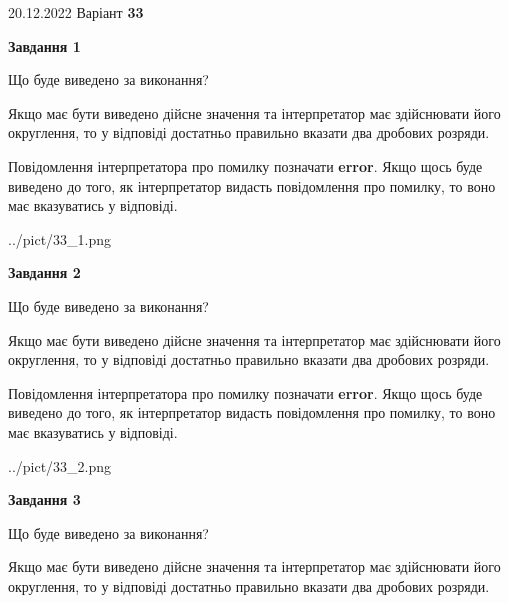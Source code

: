 \documentclass[12pt, ukrainian]{article}
\begin{document}
{20.12.2022 Варіант \No \textbf { 33 }\par}
{
\begin {Large}

{\begin {center}\textbf{Завдання 1}\end {center}}\par
Що буде виведено за виконання? \par

Якщо має бути виведено дійсне значення та інтерпретатор має здійснювати його округлення, 
то у відповіді достатньо правильно вказати два дробових розряди.

Повідомлення інтерпретатора про помилку позначати \textbf{error}.
Якщо щось буде виведено до того, як інтерпретатор видасть повідомлення про помилку, 
то воно має вказуватись у відповіді. \par

\begin{center}
	{../pict/33_1.png}
\end{center}
\newpage

{\begin {center}\textbf{Завдання 2}\end {center}}\par
Що буде виведено за виконання? \par

Якщо має бути виведено дійсне значення та інтерпретатор має здійснювати його округлення, 
то у відповіді достатньо правильно вказати два дробових розряди.

Повідомлення інтерпретатора про помилку позначати \textbf{error}.
Якщо щось буде виведено до того, як інтерпретатор видасть повідомлення про помилку, 
то воно має вказуватись у відповіді. \par

\begin{center}
	{../pict/33_2.png}
\end{center}
\newpage

{\begin {center}\textbf{Завдання 3}\end {center}}\par
Що буде виведено за виконання? \par

Якщо має бути виведено дійсне значення та інтерпретатор має здійснювати його округлення, 
то у відповіді достатньо правильно вказати два дробових розряди.


\end{Large}}
\end{document}
